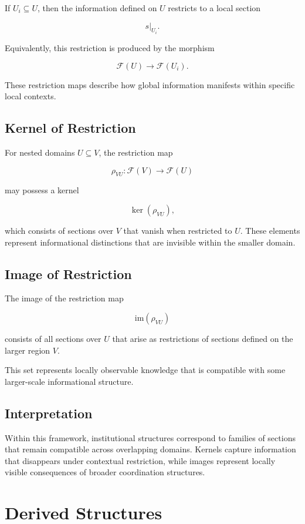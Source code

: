 \documentclass[12pt]{article}
\begin{document}
If $U_i \subseteq U$, then the information defined on $U$ restricts to a local section

\[
s|_{U_i}.
\]

Equivalently, this restriction is produced by the morphism

\[
\mathcal{F}(U) \rightarrow \mathcal{F}(U_i).
\]

These restriction maps describe how global information manifests within specific local contexts.

\subsection{Kernel of Restriction}

For nested domains $U \subseteq V$, the restriction map

\[
\rho_{VU} : \mathcal{F}(V) \rightarrow \mathcal{F}(U)
\]

may possess a kernel

\[
\ker(\rho_{VU}),
\]

which consists of sections over $V$ that vanish when restricted to $U$. These elements represent informational distinctions that are invisible within the smaller domain.

\subsection{Image of Restriction}

The image of the restriction map

\[
\mathrm{im}(\rho_{VU})
\]

consists of all sections over $U$ that arise as restrictions of sections defined on the larger region $V$.

This set represents locally observable knowledge that is compatible with some larger-scale informational structure.

\subsection{Interpretation}

Within this framework, institutional structures correspond to families of sections that remain compatible across overlapping domains. Kernels capture information that disappears under contextual restriction, while images represent locally visible consequences of broader coordination structures.

\section{Derived Structures}
\end{document}
